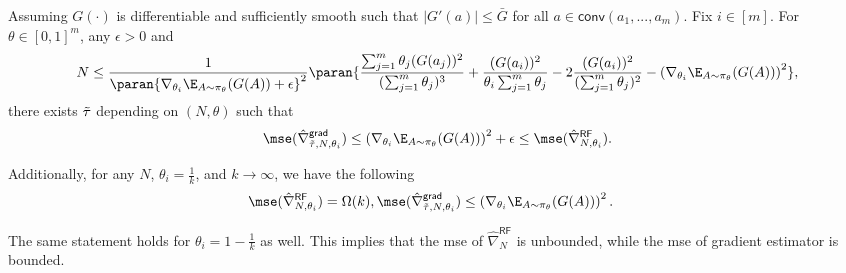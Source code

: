 


\begin{theorem}
Assuming
$G(\cdot)$ is differentiable and  sufficiently smooth such that
$|G'(a)| \le \bar{G}$ for all $a \in \mathsf{conv}(a_1,...,a_m)$. 
Fix $i \in [m]$.
For $\theta \in [0,1]^m$, any $\epsilon>0$ and 
\begin{align*}
N \le 
\frac{1}{\paran{\nabla_{\theta_i} \E_{A\sim \pi_\theta}(G(A))+\epsilon}^2}
\paran{
\frac{\sum_{j=1}^m\theta_j(G(a_j))^2}{(\sum_{j=1}^m\theta_j)^3} + \frac{(G(a_i))^2}{\theta_i\sum_{j=1}^m \theta_j} - 2 \frac{(G(a_i))^2}{(\sum_{j=1}^m \theta_j)^2}  - \left(\nabla_{\theta_i} \E_{A\sim \pi_\theta}(G(A))\right)^2},
\end{align*}
there exists $\Tilde{\tau}$ depending on $ (N, \theta)$ such that 
\begin{align*}
\mse(\hat{\nabla}^{\mathsf{grad}}_{\Tilde{\tau},N,\theta_i})
\le 
\left(\nabla_{\theta_i}\E_{A\sim \pi_\theta}(G(A))\right)^2 + {\epsilon}
\le 
\mse(\hat{\nabla}^{\mathsf{RF}}_{N,\theta_i}).
\end{align*}



 

Additionally, for any $N$, $\theta_i = \frac{1}{k}$, and $k \to \infty$, we have the following
\begin{align*}
\mse(\hat{\nabla}^{\mathsf{RF}}_{N,\theta_i}) & = \Omega(k),
 \mse(\hat{\nabla}^{\mathsf{grad}}_{\tilde{\tau},N,\theta_i})
 \le 
\left(\nabla_{\theta_i} \E_{A\sim \pi_\theta}(G(A))\right)^2.
\end{align*}

The same statement holds for $\theta_i =  1-\frac{1}{k}$ as well. This implies that the mse of $\hat{\nabla}^{\mathsf{RF}}_{N}$ is unbounded, while the mse of gradient estimator is bounded.
\label{thm:multi}
\end{theorem}









